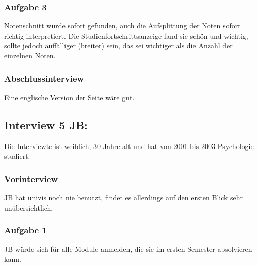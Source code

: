 \documentclass[a4paper,10pt]{scrartcl}
\begin{document}
\subsubsection*{Aufgabe 3}

Notenschnitt wurde sofort gefunden, auch die Aufsplittung der Noten sofort richtig interpretiert. Die Studienfortschrittsanzeige fand sie schön und wichtig, sollte jedoch auffälliger (breiter) sein, das sei wichtiger als die Anzahl der einzelnen Noten.

\subsubsection*{Abschlussinterview}

Eine englische Version der Seite wäre gut.

\subsection*{Interview 5 JB:}

Die Interviewte ist weiblich, 30 Jahre alt und hat von 2001 bis 2003 Psychologie studiert.

\subsubsection*{Vorinterview}

JB hat univis noch nie benutzt, findet es allerdings auf den ersten Blick sehr unübersichtlich.

\subsubsection*{Aufgabe 1}

JB würde sich für alle Module anmelden, die sie im ersten Semester absolvieren kann.
\end{document}
